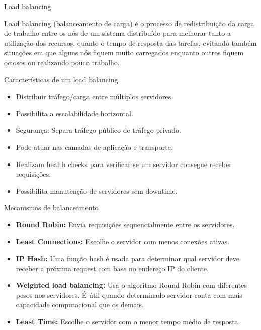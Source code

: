 \begin{frame}[fragile]{Load balancing}
    \begin{itemize}%
        Load balancing (balanceamento de carga) é o processo de redistribuição da carga de trabalho entre os nós de um sistema distribuído para melhorar tanto a utilização dos recursos, quanto o tempo de resposta das tarefas, evitando também situações em que alguns nós fiquem muito carregados enquanto outros fiquem ociosos ou realizando pouco trabalho.
    \end{itemize}
\end{frame}


\begin{frame}[fragile]{Características de um load balancing}
    \begin{itemize}%
        \item Distribuir tráfego/carga entre múltiplos servidores.
        \item Possibilita a escalabilidade horizontal.
        \item Segurança: Separa tráfego público de tráfego privado.
        \item Pode atuar nas camadas de aplicação e transporte.
        \item Realizam health checks para verificar se um servidor consegue receber requisições.
        \item Possibilita manutenção de servidores sem downtime.
    \end{itemize}
\end{frame}


\begin{frame}[fragile]{Mecanismos de balanceamento}
    \begin{itemize}%
        \item \textbf{Round Robin:} Envia requisições sequencialmente entre os servidores.
        \item \textbf{Least Connections:} Escolhe o servidor com menos conexões ativas.
        \item \textbf{IP Hash:} Uma função hash é usada para determinar qual servidor deve receber a próxima request com base no endereço IP do cliente.
        \item \textbf{Weighted load balancing:} Usa o algoritmo Round Robin com diferentes pesos nos servidores. É útil quando determinado servidor conta com mais capacidade computacional que os demais.
        \item \textbf{Least Time:} Escolhe o servidor com o menor tempo médio de resposta.
    \end{itemize}
\end{frame}

